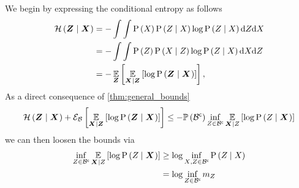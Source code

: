 \begin{proofE}
	We begin by expressing the conditional entropy as follows
	\begin{align*}
		\mathcal{H}\left({\boldsymbol Z_{}}\mid{\ensuremath{\boldsymbol X_{}}}\right) & =-\int\int\mathrm{P}\left({X_{}}\right)\mathrm{P}\left({Z_{}{}}\mid{\ensuremath{X_{}}}\right)\log\mathrm{P}\left({Z_{}{}}\mid{\ensuremath{X_{}}}\right)\mathrm{d}Z_{}\mathrm{d}X_{}\\
		& =-\int\int\mathrm{P}\left({Z_{}}\right)\mathrm{P}\left({X_{}}\mid{\ensuremath{Z_{}}}\right)\log\mathrm{P}\left({Z_{}{}}\mid{\ensuremath{X_{}}}\right)\mathrm{d}X_{}\mathrm{d}Z_{}\\
		& =-\operatorname*{\mathbb{E}}\limits_{\boldsymbol Z_{}}\left[{\operatorname*{\mathbb{E}}\limits_{\boldsymbol X_{}\mid\boldsymbol Z_{}}\left[{\log \mathrm{P}\left({\boldsymbol Z_{}}\mid{\ensuremath{\boldsymbol X_{}}}\right)}\right]}\right],
		\label{eq:entropy_observation}
	\end{align*}
	As a direct consequence of \cref{thm:general_bounds}
	\begin{equation*}
		\mathcal{H}\left({\boldsymbol Z_{}}\mid{\ensuremath{\boldsymbol X_{}}}\right)+\mathcal{E}_{\mathcal B}\left[{\operatorname*{\mathbb{E}}\limits_{\boldsymbol X_{}\mid\boldsymbol Z_{}}\left[{\log\mathrm{P}\left({\boldsymbol Z_{}}\mid{\ensuremath{\boldsymbol X_{}}}\right)}\right]}\right]\leq
		-\mathbb{P}\left({{\mathcal B}^{\mathsf{c}}}\right)\inf_{Z_{}\in{\ensuremath{\mathcal B}}^{\mathsf{c}}}\operatorname*{\mathbb{E}}\limits_{\boldsymbol X_{}\mid Z_{}}\left[{\log\mathrm{P}\left({Z_{}}\mid{\ensuremath{\boldsymbol X_{}}}\right)}\right]
	\end{equation*}
	we can then loosen the bounds via
	\begin{align*}
		\inf_{Z_{}\in{\ensuremath{\mathcal B}}^{\mathsf{c}}}\operatorname*{\mathbb{E}}\limits_{\boldsymbol X_{}\mid Z_{}}\left[{\log\mathrm{P}\left({Z_{}}\mid{\ensuremath{\boldsymbol X_{}}}\right)}\right] & \geq \log\inf_{X_{},Z_{}\in{\ensuremath{\mathcal B}}^{\mathsf{c}}}\mathrm{P}\left({Z_{}}\mid{\ensuremath{X_{}}}\right) \\
		& =\log\inf_{Z_{}\in{\ensuremath{\mathcal B}}^{\mathsf{c}}}m_{Z_{}}
	\end{align*}
\end{proofE}


